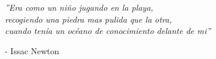 \cleardoublepage
\thispagestyle{empty}  %

\null\vfill\vfill
\textit{   
    ''Era como un niño jugando en la playa, \\
    recogiendo una piedra mas pulida que la otra,\\
    cuando tenía un océano de conocimiento delante de mi''
}
\begin{flushright}
    - Issac Newton
\end{flushright}
\vfill\vfill\vfill\vfill\vfill\null